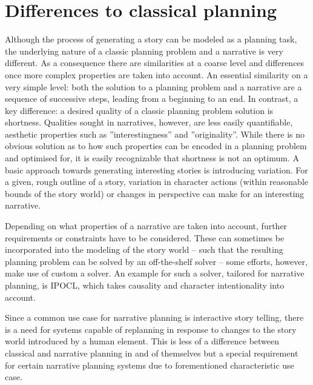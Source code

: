 \section{Differences to classical planning}\label{differences}
Although the process of generating a story can be modeled as a planning task, the underlying nature of a classic planning problem and a narrative is very different. As a consequence there are similarities at a coarse level and differences once more complex properties are taken into account. An essential similarity on a very simple level: both the solution to a planning problem and a narrative are a sequence of successive steps, leading from a beginning to an end. In contrast, a key difference: a desired quality of a classic planning problem solution is shortness. Qualities sought in narratives, however, are less easily quantifiable, aesthetic properties such as ''interestingness'' and ''originality''. While there is no obvious solution as to how such properties can be encoded in a planning problem and optimised for, it is easily recognizable that shortness is not an optimum. A basic approach towards generating interesting stories is introducing variation. For a given, rough outline of a story, variation in character actions (within reasonable bounds of the story world) or changes in perspective can make for an interesting narrative.

Depending on what properties of a narrative are taken into account, further requirements or constraints have to be considered. These can sometimes be incorporated into the modeling of the story world -- such that the resulting planning problem can be solved by an off-the-shelf solver -- some efforts, however, make use of custom a solver. An example for such a solver, tailored for narrative planning, is IPOCL\cite{Riedl04}, which takes causality and character intentionality into account.

Since a common use case for narrative planning is interactive story telling, there is a need for systems capable of replanning in response to changes to the story world introduced by a human element. This is less of a difference between classical and narrative planning in and of themselves but a special requirement for certain narrative planning systems due to forementioned characteristic use case.
%
%
%
